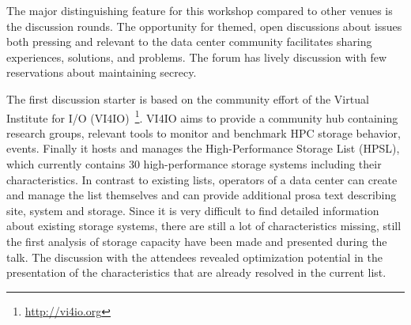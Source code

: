 \documentclass{llncs}
\begin{document}
The major distinguishing feature for this workshop compared to other venues is the discussion rounds. The opportunity for themed, open discussions about issues both pressing and relevant to the data center community facilitates sharing experiences, solutions, and problems. The forum has lively discussion with few reservations about maintaining secrecy.


The first discussion starter is based on the community effort of the Virtual Institute for I/O (VI4IO)~\footnote{\url{http://vi4io.org}}.
VI4IO aims to provide a community hub containing research groups, relevant tools to monitor and benchmark HPC storage behavior, events. 
Finally it hosts and manages the High-Performance Storage List (HPSL), which currently contains 30 high-performance storage systems including their characteristics.
In contrast to existing lists, operators of a data center can create and manage the list themselves and can provide additional prosa text describing site, system and storage.
Since it is very difficult to find detailed information about existing storage systems, there are still a lot of characteristics missing, still the first analysis of storage capacity have been made and presented during the talk.
The discussion with the attendees revealed optimization potential in the presentation of the characteristics that are already resolved in the current list.
\end{document}
